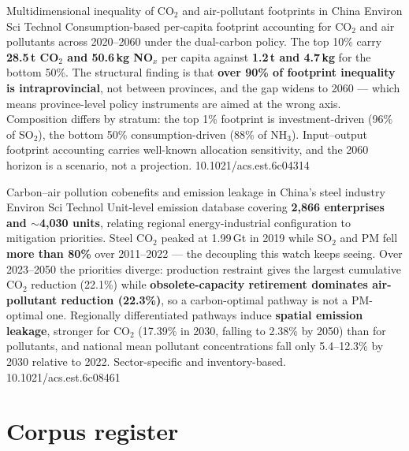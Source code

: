 \documentclass[10pt]{article}
\begin{document}
{Multidimensional inequality of CO$_2$ and air-pollutant footprints in China}
{Environ Sci Technol}
{Consumption-based per-capita footprint accounting for CO$_2$ and air pollutants across
2020--2060 under the dual-carbon policy. The top 10\% carry \textbf{28.5\,t CO$_2$ and
50.6\,kg NO$_x$} per capita against \textbf{1.2\,t and 4.7\,kg} for the bottom 50\%. The
structural finding is that \textbf{over 90\% of footprint inequality is intraprovincial},
not between provinces, and the gap widens to 2060 --- which means province-level policy
instruments are aimed at the wrong axis. Composition differs by stratum: the top 1\%
footprint is investment-driven (96\% of SO$_2$), the bottom 50\% consumption-driven
(88\% of NH$_3$). Input--output footprint accounting carries well-known allocation
sensitivity, and the 2060 horizon is a scenario, not a projection.}
{10.1021/acs.est.6c04314}

{Carbon--air pollution cobenefits and emission leakage in China's steel industry}
{Environ Sci Technol}
{Unit-level emission database covering \textbf{2{,}866 enterprises and $\sim$4{,}030
units}, relating regional energy-industrial configuration to mitigation priorities. Steel
CO$_2$ peaked at 1.99\,Gt in 2019 while SO$_2$ and PM fell \textbf{more than 80\%} over
2011--2022 --- the decoupling this watch keeps seeing. Over 2023--2050 the priorities
diverge: production restraint gives the largest cumulative CO$_2$ reduction (22.1\%)
while \textbf{obsolete-capacity retirement dominates air-pollutant reduction (22.3\%)},
so a carbon-optimal pathway is not a PM-optimal one. Regionally differentiated pathways
induce \textbf{spatial emission leakage}, stronger for CO$_2$ (17.39\% in 2030, falling to
2.38\% by 2050) than for pollutants, and national mean pollutant concentrations fall only
5.4--12.3\% by 2030 relative to 2022. Sector-specific and inventory-based.}
{10.1021/acs.est.6c08461}

\clearpage

\section*{\sffamily\bfseries\color{Deep}Corpus register}
\vspace{-1.5mm}{\color{Amber}\rule{\linewidth}{1.1pt}}\vspace{2.5mm}


\end{document}
